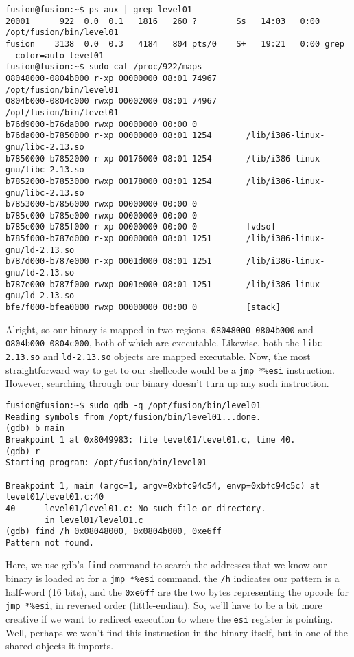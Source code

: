 \begin{lstlisting}
fusion@fusion:~$ ps aux | grep level01
20001      922  0.0  0.1   1816   260 ?        Ss   14:03   0:00 /opt/fusion/bin/level01
fusion    3138  0.0  0.3   4184   804 pts/0    S+   19:21   0:00 grep --color=auto level01
fusion@fusion:~$ sudo cat /proc/922/maps
08048000-0804b000 r-xp 00000000 08:01 74967      /opt/fusion/bin/level01
0804b000-0804c000 rwxp 00002000 08:01 74967      /opt/fusion/bin/level01
b76d9000-b76da000 rwxp 00000000 00:00 0 
b76da000-b7850000 r-xp 00000000 08:01 1254       /lib/i386-linux-gnu/libc-2.13.so
b7850000-b7852000 r-xp 00176000 08:01 1254       /lib/i386-linux-gnu/libc-2.13.so
b7852000-b7853000 rwxp 00178000 08:01 1254       /lib/i386-linux-gnu/libc-2.13.so
b7853000-b7856000 rwxp 00000000 00:00 0 
b785c000-b785e000 rwxp 00000000 00:00 0 
b785e000-b785f000 r-xp 00000000 00:00 0          [vdso]
b785f000-b787d000 r-xp 00000000 08:01 1251       /lib/i386-linux-gnu/ld-2.13.so
b787d000-b787e000 r-xp 0001d000 08:01 1251       /lib/i386-linux-gnu/ld-2.13.so
b787e000-b787f000 rwxp 0001e000 08:01 1251       /lib/i386-linux-gnu/ld-2.13.so
bfe7f000-bfea0000 rwxp 00000000 00:00 0          [stack]
\end{lstlisting}
Alright, so our binary is mapped in two regions, \texttt{08048000-0804b000}
and \texttt{0804b000-0804c000}, both of which are executable. Likewise,
both the \texttt{libc-2.13.so} and \texttt{ld-2.13.so} objects are
mapped executable. Now,
the most straightforward way to get to our shellcode would be a 
\texttt{jmp *\%esi} instruction. However, searching through
our binary doesn't turn up any such instruction.

\begin{lstlisting}
fusion@fusion:~$ sudo gdb -q /opt/fusion/bin/level01
Reading symbols from /opt/fusion/bin/level01...done.
(gdb) b main
Breakpoint 1 at 0x8049983: file level01/level01.c, line 40.
(gdb) r
Starting program: /opt/fusion/bin/level01 

Breakpoint 1, main (argc=1, argv=0xbfc94c54, envp=0xbfc94c5c) at level01/level01.c:40
40      level01/level01.c: No such file or directory.
        in level01/level01.c
(gdb) find /h 0x08048000, 0x0804b000, 0xe6ff
Pattern not found.
\end{lstlisting}

Here, we use gdb's \texttt{find} command to search the addresses
that we know our binary is loaded at for a \texttt{jmp *\%esi} command.
the \texttt{/h} indicates our pattern is a half-word (16 bits),
and the \texttt{0xe6ff} are the two bytes representing the opcode for
\texttt{jmp *\%esi}, in reversed order (little-endian).
So, we'll have to be a bit more creative if we want to redirect
execution to where the \texttt{esi} register is pointing.
Well, perhaps we won't find this instruction in the binary itself,
but in one of the shared objects it imports.

